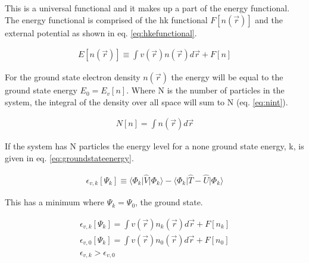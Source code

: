 This is a universal functional\cite{hohenbergkohn} and it makes up a part of the energy functional.  The energy functional is comprised of the \acrshort{hk} functional $F[n(\vec{r})]$ and the external potential as shown in eq. \ref{eq:hkefunctional}.

\begin{equation}
\begin{split}
E[n(\vec{r})] \equiv \int v(\vec{r}) n(\vec{r}) d\vec{r} + F[n]
\end{split}
\label{eq:hkefunctional}
\end{equation}

For the ground state electron density $n(\vec{r})$ the energy will be equal to the ground state energy $E_0 = E_v[n]$.  Where N is the number of particles in the system, the integral of the density over all space will sum to N (eq. \ref{eq:nint}).

\begin{equation}
\begin{split}
N[n] = \int n(\vec{r}) d\vec{r}
\end{split}
\label{eq:nint}
\end{equation}

If the system has N particles the energy level for a none ground state energy, k, is given in eq. \ref{eq:groundstateenergy}.

\begin{equation}
\begin{split}
\epsilon_{v,k} [\Psi_k] \equiv \langle \Phi_k \lvert \hat{V} \rvert \Phi_k \rangle - \langle \Phi_k \lvert \hat{T} - \hat{U} \rvert \Phi_k \rangle 
\end{split}
\label{eq:groundstateenergy}
\end{equation}

This has a minimum where $\Psi_k = \Psi_0$, the ground state.

\begin{equation}
\begin{split}
\epsilon_{v,k} [\Psi_k] = \int v(\vec{r}) n_k(\vec{r}) d\vec{r} + F[n_k] \\
\epsilon_{v,0} [\Psi_k] = \int v(\vec{r}) n_0(\vec{r}) d\vec{r} + F[n_0] \\
\epsilon_{v,k} > \epsilon_{v,0}
\end{split}
\label{eq:groundstateenergy1}
\end{equation}

